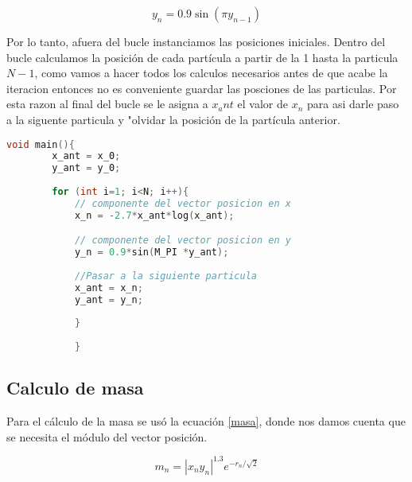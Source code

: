 \documentclass[12pt]{article}
\begin{document}
\begin{equation}
    \label{y_n}
    y_n = 0.9 \sin(\pi y_{n-1})
\end{equation}

Por lo tanto, afuera del bucle instanciamos las posiciones iniciales. Dentro del bucle calculamos la posición de cada partícula a partir de la 1 hasta la particula $N-1$, como vamos a hacer todos los calculos necesarios antes de que acabe la iteracion entonces no es conveniente guardar las posciones de las particulas. Por esta razon al final del bucle se le asigna a $x_ant$ el valor de $x_n$ para asi darle paso a la siguente particula y "olvidar la posición de la partícula anterior.

\begin{lstlisting}[language=C, caption={Calculo de componentes de posición}, style=mystyle]
    void main(){
        x_ant = x_0;
        y_ant = y_0;
                
        for (int i=1; i<N; i++){
            // componente del vector posicion en x
            x_n = -2.7*x_ant*log(x_ant);

            // componente del vector posicion en y
            y_n = 0.9*sin(M_PI *y_ant);        
             
            //Pasar a la siguiente particula
            x_ant = x_n;
            y_ant = y_n;
        
            }       
            
            }

    \end{lstlisting}


\subsection{Calculo de masa}

Para el cálculo de la masa se usó la ecuación \ref{masa}, donde nos damos cuenta que se necesita el módulo del vector posición.

\begin{equation}
    \label{masa}
    m_n = |x_n y_n|^{1.3} e^{-r_n / \sqrt{2}}
\end{equation}
\end{document}
